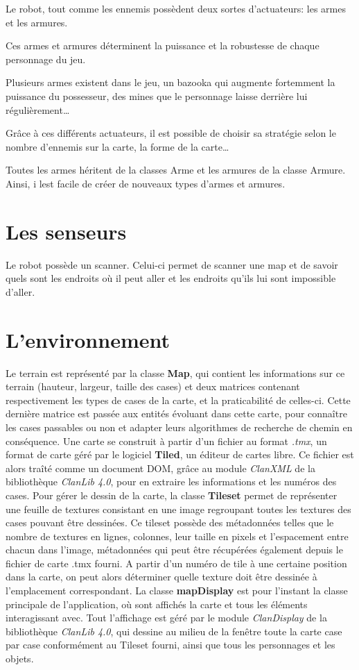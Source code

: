 \documentclass[a4paper 12pts]{article}
\begin{document}
Le robot, tout comme les ennemis possèdent deux sortes d'actuateurs: les armes et les armures.

Ces armes et armures déterminent la puissance et la robustesse de chaque personnage du jeu.

Plusieurs armes existent dans le jeu, un bazooka qui augmente fortemment la puissance du possesseur, des mines que le personnage laisse derrière lui régulièrement\ldots

Grâce à ces différents actuateurs, il est possible de choisir sa stratégie selon le nombre d'ennemis sur la carte, la forme de la carte\ldots

Toutes les armes héritent de la classes Arme et les armures de la classe Armure. Ainsi, i lest facile de créer de nouveaux types d'armes et armures.

\section{Les senseurs}

Le robot possède un scanner. Celui-ci permet de scanner une map et de savoir quels sont les endroits où il peut aller et les endroits qu'ils lui sont impossible d'aller.


\section{L'environnement}

Le terrain est représenté par la classe \textbf{Map}, qui contient les informations sur ce terrain (hauteur, largeur, taille des cases) et deux matrices contenant respectivement les types de cases de la carte, et la praticabilité de celles-ci. Cette dernière matrice est passée aux entités évoluant dans cette carte, pour connaître les cases passables ou non et adapter leurs algorithmes de recherche de chemin en conséquence.
Une carte se construit à partir d'un fichier au format \emph{.tmx}, un format de carte géré par le logiciel \textbf{Tiled}, un éditeur de cartes libre. Ce fichier est alors traîté comme un document DOM, grâce au module \emph{ClanXML} de la bibliothèque \emph{ClanLib 4.0}, pour en extraire les informations et les numéros des cases.
Pour gérer le dessin de la carte, la classe \textbf{Tileset} permet de représenter une feuille de textures consistant en une image regroupant toutes les textures des cases pouvant être dessinées. Ce tileset possède des métadonnées telles que le nombre de textures en lignes, colonnes, leur taille en pixels et l'espacement entre chacun dans l'image, métadonnées qui peut être récupérées également depuis le fichier de carte .tmx fourni. A partir d'un numéro de tile à une certaine position dans la carte, on peut alors déterminer quelle texture doit être dessinée à l'emplacement correspondant. 
La classe \textbf{mapDisplay} est pour l'instant la classe principale de l'application, où sont affichés la carte et tous les éléments interagissant avec. Tout l'affichage est géré par le module \emph{ClanDisplay} de la bibliothèque \emph{ClanLib 4.0}, qui dessine au milieu de la fenêtre toute la carte case par case conformément au Tileset fourni, ainsi que tous les personnages et les objets.
\end{document}
